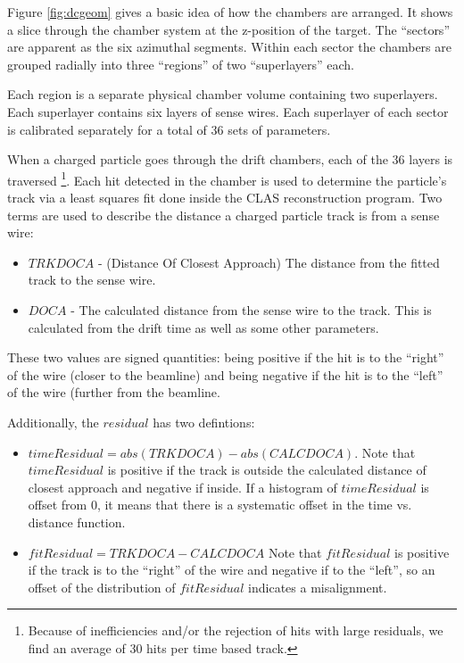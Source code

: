\documentclass{article}
\begin{document}
Figure \ref{fig:dcgeom} gives a basic idea of
how the chambers are arranged. 
It shows a slice through the chamber system at the z-position of the
target.  The ``sectors'' are apparent as the six azimuthal segments.  Within
each sector the chambers are grouped radially into three ``regions'' of two
``superlayers'' each.


	
Each region is a separate physical chamber volume containing
two superlayers. Each superlayer contains six layers of sense wires. 
Each superlayer of each sector is calibrated separately for a
total of 36 sets of parameters.

When a charged particle goes through the drift chambers, each
of the 36 layers is traversed
\footnote{Because of inefficiencies and/or the rejection of hits with large
residuals, we find an average of 30 hits per time based
track.}.
Each hit detected in the chamber is used to determine the particle's
track via a least squares fit done inside the CLAS reconstruction 
program.  Two terms are used to describe
the distance a charged particle track is from a sense wire:
\begin{itemize}
\item $TRKDOCA$ - (Distance Of Closest Approach) The distance from the fitted
track to the sense wire.
\item $DOCA$ - The calculated distance from the sense wire to the track. This
is calculated from the drift time as well as some other parameters.
\end{itemize}
These two values are signed quantities: being positive if the hit is to the
``right'' of the wire (closer to the beamline) and being negative if the
hit is to the ``left'' of the wire (further from the beamline.

\noindent
Additionally, the $residual$ has two defintions:
\begin{itemize}
\item $timeResidual = abs(TRKDOCA)-abs(CALCDOCA)$.  Note that $timeResidual$ is
positive if the track is outside the calculated distance of closest approach
and negative if inside.  If a histogram of $timeResidual$ is offset from 0, it
means that there is a systematic offset in the time vs. distance function.
\item $fitResidual = TRKDOCA-CALCDOCA$  Note that $fitResidual$ is positive
if the track is to the ``right'' of the wire and negative if to the ``left'',
so an offset of the distribution of $fitResidual$ indicates a misalignment.
\end{itemize}
\end{document}
